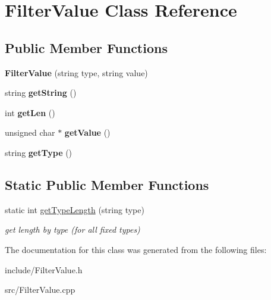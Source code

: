 \hypertarget{classFilterValue}{}\section{Filter\+Value Class Reference}
\label{classFilterValue}
\subsection*{Public Member Functions}
\begin{DoxyCompactItemize}
\item 
\mbox{\label{classFilterValue_afd9ace492d5ea61bf43abd1657dddb9d}} 
{\bfseries Filter\+Value} (string type, string value)
\item 
\mbox{\label{classFilterValue_ace83c5669d4e07203202ae3431c7f3dd}} 
string {\bfseries get\+String} ()
\item 
\mbox{\label{classFilterValue_add166f01876f2b29be96165c9653a9de}} 
int {\bfseries get\+Len} ()
\item 
\mbox{\label{classFilterValue_a4364d94e9f2397d9b8ee29d7a729fe6c}} 
unsigned char $\ast$ {\bfseries get\+Value} ()
\item 
\mbox{\label{classFilterValue_a3182fbb2edc32afad2c7c99bc262481b}} 
string {\bfseries get\+Type} ()
\end{DoxyCompactItemize}
\subsection*{Static Public Member Functions}
\begin{DoxyCompactItemize}
\item 
\mbox{\label{classFilterValue_a835706c98ea56790dab2b15cc3951a76}} 
static int \hyperlink{classFilterValue_a835706c98ea56790dab2b15cc3951a76}{get\+Type\+Length} (string type)
\begin{DoxyCompactList}\small\item\em get length by type (for all fixed types) \end{DoxyCompactList}\end{DoxyCompactItemize}


The documentation for this class was generated from the following files\+:\begin{DoxyCompactItemize}
\item 
include/Filter\+Value.\+h\item 
src/Filter\+Value.\+cpp\end{DoxyCompactItemize}
